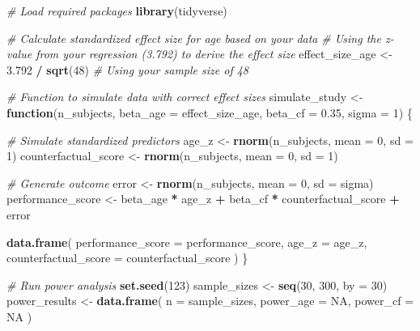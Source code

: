 \documentclass[
  doc]{apa6}
\newenvironment{Shaded}{\begin{snugshade}}{\end{snugshade}}
\newcommand{\AttributeTok}[1]{\textcolor[rgb]{0.13,0.29,0.53}{#1}}
\newcommand{\CommentTok}[1]{\textcolor[rgb]{0.56,0.35,0.01}{\textit{#1}}}
\newcommand{\ConstantTok}[1]{\textcolor[rgb]{0.56,0.35,0.01}{#1}}
\newcommand{\ControlFlowTok}[1]{\textcolor[rgb]{0.13,0.29,0.53}{\textbf{#1}}}
\newcommand{\DecValTok}[1]{\textcolor[rgb]{0.00,0.00,0.81}{#1}}
\newcommand{\FloatTok}[1]{\textcolor[rgb]{0.00,0.00,0.81}{#1}}
\newcommand{\FunctionTok}[1]{\textcolor[rgb]{0.13,0.29,0.53}{\textbf{#1}}}
\newcommand{\NormalTok}[1]{#1}
\newcommand{\OtherTok}[1]{\textcolor[rgb]{0.56,0.35,0.01}{#1}}
\newcommand{\SpecialCharTok}[1]{\textcolor[rgb]{0.81,0.36,0.00}{\textbf{#1}}}
\begin{document}
\begin{Shaded}
\begin{Highlighting}[]
\CommentTok{\# Load required packages}
\FunctionTok{library}\NormalTok{(tidyverse)}

\CommentTok{\# Calculate standardized effect size for age based on your data}
\CommentTok{\# Using the z{-}value from your regression (3.792) to derive the effect size}
\NormalTok{effect\_size\_age }\OtherTok{\textless{}{-}} \FloatTok{3.792} \SpecialCharTok{/} \FunctionTok{sqrt}\NormalTok{(}\DecValTok{48}\NormalTok{)  }\CommentTok{\# Using your sample size of 48}

\CommentTok{\# Function to simulate data with correct effect sizes}
\NormalTok{simulate\_study }\OtherTok{\textless{}{-}} \ControlFlowTok{function}\NormalTok{(n\_subjects, }
                          \AttributeTok{beta\_age =}\NormalTok{ effect\_size\_age,  }
                          \AttributeTok{beta\_cf =} \FloatTok{0.35}\NormalTok{,            }
                          \AttributeTok{sigma =} \DecValTok{1}\NormalTok{) \{}
  
  \CommentTok{\# Simulate standardized predictors}
\NormalTok{  age\_z }\OtherTok{\textless{}{-}} \FunctionTok{rnorm}\NormalTok{(n\_subjects, }\AttributeTok{mean =} \DecValTok{0}\NormalTok{, }\AttributeTok{sd =} \DecValTok{1}\NormalTok{)}
\NormalTok{  counterfactual\_score }\OtherTok{\textless{}{-}} \FunctionTok{rnorm}\NormalTok{(n\_subjects, }\AttributeTok{mean =} \DecValTok{0}\NormalTok{, }\AttributeTok{sd =} \DecValTok{1}\NormalTok{)}
  
  \CommentTok{\# Generate outcome}
\NormalTok{  error }\OtherTok{\textless{}{-}} \FunctionTok{rnorm}\NormalTok{(n\_subjects, }\AttributeTok{mean =} \DecValTok{0}\NormalTok{, }\AttributeTok{sd =}\NormalTok{ sigma)}
\NormalTok{  performance\_score }\OtherTok{\textless{}{-}}\NormalTok{ beta\_age }\SpecialCharTok{*}\NormalTok{ age\_z }\SpecialCharTok{+}
\NormalTok{                      beta\_cf }\SpecialCharTok{*}\NormalTok{ counterfactual\_score }\SpecialCharTok{+}
\NormalTok{                      error}
  
  \FunctionTok{data.frame}\NormalTok{(}
    \AttributeTok{performance\_score =}\NormalTok{ performance\_score,}
    \AttributeTok{age\_z =}\NormalTok{ age\_z,}
    \AttributeTok{counterfactual\_score =}\NormalTok{ counterfactual\_score}
\NormalTok{  )}
\NormalTok{\}}

\CommentTok{\# Run power analysis}
\FunctionTok{set.seed}\NormalTok{(}\DecValTok{123}\NormalTok{)}
\NormalTok{sample\_sizes }\OtherTok{\textless{}{-}} \FunctionTok{seq}\NormalTok{(}\DecValTok{30}\NormalTok{, }\DecValTok{300}\NormalTok{, }\AttributeTok{by =} \DecValTok{30}\NormalTok{)}
\NormalTok{power\_results }\OtherTok{\textless{}{-}} \FunctionTok{data.frame}\NormalTok{(}
  \AttributeTok{n =}\NormalTok{ sample\_sizes,}
  \AttributeTok{power\_age =} \ConstantTok{NA}\NormalTok{,}
  \AttributeTok{power\_cf =} \ConstantTok{NA}
\NormalTok{)}


\end{Highlighting}
\end{Shaded}
\end{document}

